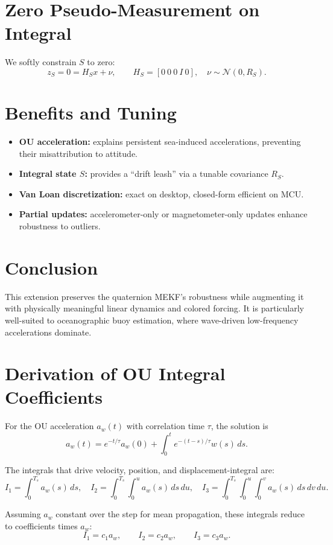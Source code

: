 \documentclass[11pt]{article}
\begin{document}
\section{Zero Pseudo-Measurement on Integral}
We softly constrain $S$ to zero:
\[
z_S = 0 = H_S x + \nu,\qquad
H_S=[0\ 0\ 0\ I\ 0],\quad \nu\sim\mathcal{N}(0,R_S).
\]

\section{Benefits and Tuning}
\begin{itemize}
  \item \textbf{OU acceleration:} explains persistent sea-induced accelerations, preventing their misattribution to attitude.
  \item \textbf{Integral state $S$:} provides a “drift leash” via a tunable covariance $R_S$.
  \item \textbf{Van Loan discretization:} exact on desktop, closed-form efficient on MCU.
  \item \textbf{Partial updates:} accelerometer-only or magnetometer-only updates enhance robustness to outliers.
\end{itemize}

\section{Conclusion}
This extension preserves the quaternion MEKF’s robustness while augmenting it with physically meaningful linear dynamics and colored forcing. 
It is particularly well-suited to oceanographic buoy estimation, where wave-driven low-frequency accelerations dominate.

\appendix
\section{Derivation of OU Integral Coefficients}

For the OU acceleration $a_w(t)$ with correlation time $\tau$, the solution is
\[
a_w(t) = e^{-t/\tau} a_w(0) + \int_0^t e^{-(t-s)/\tau} w(s)\,ds.
\]

The integrals that drive velocity, position, and displacement-integral are:
\[
I_1=\int_0^{T_s} a_w(s)\,ds,\quad
I_2=\int_0^{T_s}\!\int_0^u a_w(s)\,ds\,du,\quad
I_3=\int_0^{T_s}\!\int_0^u\!\int_0^v a_w(s)\,ds\,dv\,du.
\]

Assuming $a_w$ constant over the step for mean propagation,
these integrals reduce to coefficients times $a_w$:
\[
I_1=c_1 a_w,\qquad I_2=c_2 a_w,\qquad I_3=c_3 a_w.
\]
\end{document}
